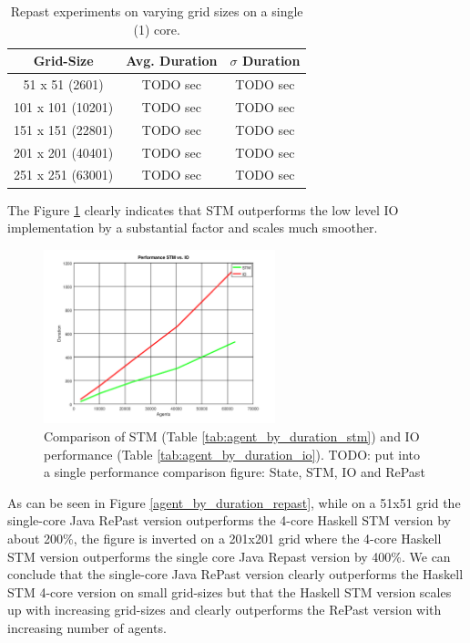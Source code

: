 \begin{table}
	\centering
  	\begin{tabular}{ c || c | c }
        Grid-Size & Avg. Duration & $\sigma$ Duration \\ \hline \hline 
   		51 x 51   (2601)  & TODO sec & TODO sec \\ \hline
   		101 x 101 (10201) & TODO sec & TODO sec \\ \hline
   		151 x 151 (22801) & TODO sec & TODO sec \\ \hline
   		201 x 201 (40401) & TODO sec & TODO sec \\ \hline 
   		251 x 251 (63001) & TODO sec & TODO sec \\ \hline 
  	\end{tabular}
  	
  	\caption{Repast experiments on varying grid sizes on a single (1) core.}
	\label{tab:varyinggrid_constcores_repast}
\end{table}

The Figure \ref{fig:agent_by_duration} clearly indicates that STM outperforms the low level IO implementation by a substantial factor and scales much smoother.
\begin{figure}
	\centering
	\includegraphics[width=0.6\textwidth, angle=0]{./fig/agents_duration_stm_io.png}
	\caption{Comparison of STM (Table \ref{tab:agent_by_duration_stm}) and IO performance (Table \ref{tab:agent_by_duration_io}). TODO: put into a single performance comparison figure: State, STM, IO and RePast}
	\label{fig:agent_by_duration}
\end{figure}

As can be seen in Figure \ref{agent_by_duration_repast}, while on a 51x51 grid the single-core Java RePast version outperforms the 4-core Haskell STM version by about 200\%, the figure is inverted on a 201x201 grid where the 4-core Haskell STM version outperforms the single core Java Repast version by 400\%. We can conclude that the single-core Java RePast version clearly outperforms the Haskell STM 4-core version on small grid-sizes but that the Haskell STM version scales up with increasing grid-sizes and clearly outperforms the RePast version with increasing number of agents.

